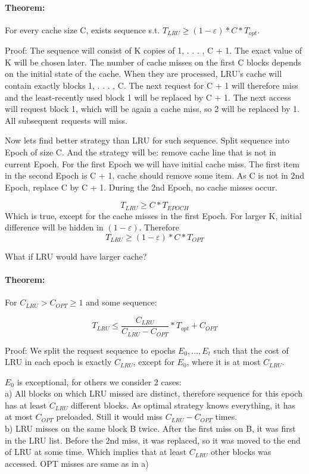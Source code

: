 \documentclass[12pt]{article}
\begin{document}
\paragraph{Theorem:} For every cache size C, exists sequence s.t. $T_{LRU} \geq (1 - \varepsilon) * C * T_{opt}$.

Proof: The sequence will consist of K copies of 1, . . . , C + 1. The exact value of K will be chosen later.
The number of cache misses on the first C blocks depends on the initial state of the cache. When they are processed, LRU’s cache will contain exactly blocks 1, . . . , C.
The next request for C + 1 will therefore miss and the least-recently used block 1 will be replaced by C + 1.
The next access will request block 1, which will be again a cache miss, so 2 will be replaced by 1. All subsequent requests will miss.

Now lets find better strategy than LRU for such sequence. Split sequence into Epoch of size C. And the strategy will be: remove cache line that is not in current Epoch.
For the first Epoch we will have initial cache miss. The first item in the second Epoch is C + 1, cache should remove some item. As C is not in 2nd Epoch, replace C by C + 1.
During the 2nd Epoch, no cache misses occur.

\[ T_{LRU} \geq C * T_{EPOCH} \]
Which is true, except for the cache misses in the first Epoch. For larger K, initial difference will be hidden in $(1 - \varepsilon)$. Therefore
\[ T_{LRU} \geq (1 - \varepsilon) * C * T_{OPT} \]

What if LRU would have larger cache?

\paragraph{Theorem:} For $ C_{LRU} > C_{OPT} \geq 1$ and some sequence:

\[T_{LRU} \leq \frac{C_{LRU}}{C_{LRU} - C_{OPT}} * T_{opt} + C_{OPT}\]

Proof: We split the request sequence to epochs $E_0 , . . . , E_t$ such that the cost of LRU in each epoch is exactly $C_{LRU}$, except for $E_0$, where it is at most $C_{LRU}$.

$E_0$ is exceptional, for others we consider 2 cases: \\
a) All blocks on which LRU missed are distinct, therefore sequence for this epoch has at least $C_{LRU}$ different blocks. As optimal strategy knows everything, it has at most $C_{OPT}$ preloaded. Still it would miss $C_{LRU} - C_{OPT}$ times. \\
b) LRU misses on the same block B twice. After the first miss on B, it was first in the LRU list. Before the 2nd miss, it was replaced, so it was moved to the end of LRU at some time. Which implies that at least $C_{LRU}$ other blocks was accessed. OPT misses are same as in a)
\end{document}
